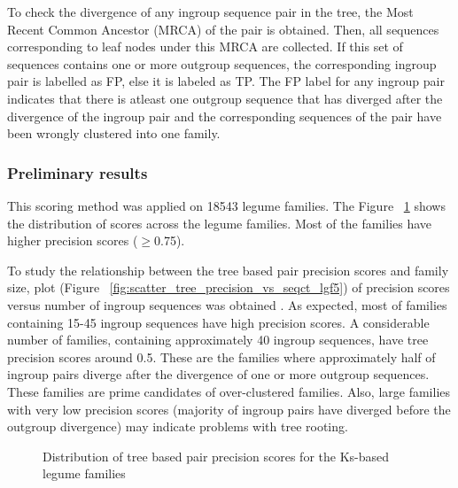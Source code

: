 \documentclass{article}
\begin{document}
		To check the divergence of any ingroup sequence pair in the tree, the Most Recent Common Ancestor (MRCA) of the pair is obtained. Then, all sequences corresponding to leaf nodes under this MRCA are collected. If this set of sequences contains one or more outgroup sequences, the corresponding ingroup pair is labelled as FP, else it is labeled as TP. The FP label for any ingroup pair indicates that there is atleast one outgroup sequence that has diverged after the divergence of the ingroup pair and the corresponding sequences of the pair have been wrongly clustered into one family. 
		
		\subsubsection{Preliminary results}
		This scoring method was applied on 18543 legume families. The Figure ~\ref{fig:hist_tree_precision_scores_lgf5} shows the distribution of scores across the legume families. Most of the families have higher precision scores ($\geq$0.75).
		
		To study the relationship between the tree based pair precision scores and family size, plot (Figure ~\ref{fig:scatter_tree_precision_vs_seqct_lgf5}) of precision scores versus number of ingroup sequences was obtained . As expected, most of families containing 15-45 ingroup sequences  have high precision scores. A considerable number of families, containing approximately 40 ingroup sequences, have tree precision scores around 0.5. These are the families where approximately half of ingroup pairs diverge after the divergence of one or more outgroup sequences. These families are prime candidates of over-clustered families. Also, large families with very low precision scores (majority of ingroup pairs have diverged before the outgroup divergence) may indicate problems with tree rooting.
		
		
		\begin{figure}[h!]
			\caption{Distribution of tree based pair precision scores for the Ks-based legume families}
			\label{fig:hist_tree_precision_scores_lgf5}
		\end{figure}
		
\end{document}
